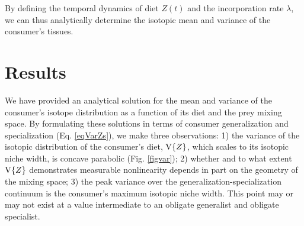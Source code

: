 \documentclass{frontiersSCNS}
\begin{document}
\noindent By defining the temporal dynamics of diet $Z(t)$ and the incorporation rate $\lambda$, we can thus analytically determine the isotopic mean and variance of the consumer's tissues.







\section{Results}



We have provided an analytical solution for the mean and variance of the consumer's isotope distribution as a function of its diet and the prey mixing space.
By formulating these solutions in terms of consumer generalization and specialization (Eq. \ref{eqVarZs}), we make three observations:
1) the variance of the isotopic distribution of the consumer's diet, ${\rm V}\{Z\}$, which scales to its isotopic niche width, is concave parabolic (Fig. \ref{figvar}); 
2) whether and to what extent ${\rm V}\{Z\}$ demonstrates measurable nonlinearity depends in part on the geometry of the mixing space;
3) the peak variance over the generalization-specialization continuum is the consumer's maximum isotopic niche width.
This point may or may not exist at a value intermediate to an obligate generalist and obligate specialist.
\end{document}
